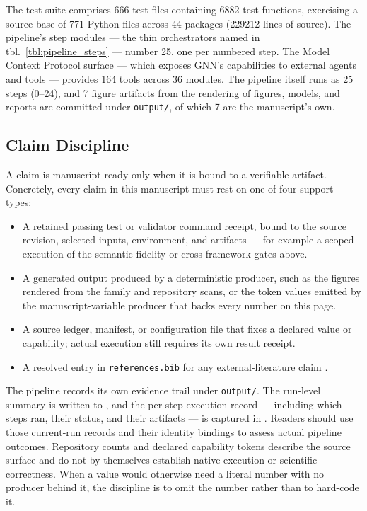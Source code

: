 \documentclass[
  english,
  9pt,
]{extarticle}
\providecommand{\tightlist}{%
  \setlength{\itemsep}{0pt}\setlength{\parskip}{0pt}}
\begin{document}
The test suite comprises 666 test files containing 6882 test functions,
exercising a source base of 771 Python files across 44 packages (229212
lines of source). The pipeline's step modules --- the thin orchestrators
named in tbl.~\ref{tbl:pipeline_steps} --- number 25, one per numbered
step. The Model Context Protocol surface --- which exposes GNN's
capabilities to external agents and tools --- provides 164 tools across
36 modules. The pipeline itself runs as 25 steps (0--24), and 7 figure
artifacts from the rendering of figures, models, and reports are
committed under \texttt{output/}, of which 7 are the manuscript's own.

\subsection{Claim Discipline}\label{claim-discipline}

A claim is manuscript-ready only when it is bound to a verifiable
artifact. Concretely, every claim in this manuscript must rest on one of
four support types:

\begin{itemize}
\tightlist
\item
  A retained passing test or validator command receipt, bound to the
  source revision, selected inputs, environment, and artifacts --- for
  example a scoped execution of the semantic-fidelity or cross-framework
  gates above.
\item
  A generated output produced by a deterministic producer, such as the
  figures rendered from the family and repository scans, or the token
  values emitted by the manuscript-variable producer that backs every
  number on this page.
\item
  A source ledger, manifest, or configuration file that fixes a declared
  value or capability; actual execution still requires its own result
  receipt.
\item
  A resolved entry in \texttt{references.bib} for any
  external-literature claim \citep{friston2010, parr2022}.
\end{itemize}

The pipeline records its own evidence trail under \texttt{output/}. The
run-level summary is written to , and
the per-step execution record --- including which steps ran, their
status, and their artifacts --- is captured in
. Readers should use those
current-run records and their identity bindings to assess actual
pipeline outcomes. Repository counts and declared capability tokens
describe the source surface and do not by themselves establish native
execution or scientific correctness. When a value would otherwise need a
literal number with no producer behind it, the discipline is to omit the
number rather than to hard-code it.
\end{document}
